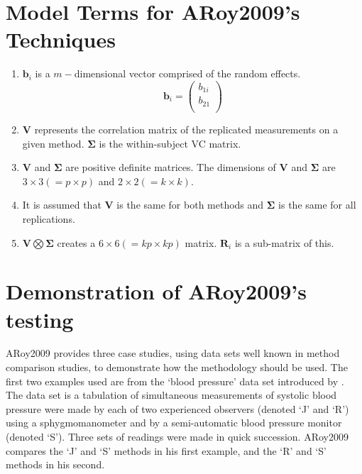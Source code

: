\documentclass[12pt, a4paper]{report}
\theoremstyle{plain}
\theoremstyle{definition}
\theoremstyle{remark}
\begin{document}
	\section{Model Terms for ARoy2009's Techniques}
	\begin{enumerate}
		\item $\boldsymbol{b}_{i}$ is a $m-$dimensional vector comprised of
		the random effects.
		\begin{equation}
		\boldsymbol{b}_{i} = \left( \begin{array}{c}
		b_{1i} \\
		b_{21}  \\
		\end{array}\right)
		\end{equation}
		
		\item $\boldsymbol{V}$ represents the correlation matrix of the replicated measurements on a given method.
		$\boldsymbol{\Sigma}$ is the within-subject VC matrix.
		
		\item $\boldsymbol{V}$ and $\boldsymbol{\Sigma}$ are positive
		definite matrices. The dimensions of $\boldsymbol{V}$ and
		$\boldsymbol{\Sigma}$ are $3 \times 3 ( = p \times p )$ and $ 2 \times
		2 (= k \times k)$.
		
		\item It is assumed that $\boldsymbol{V}$ is the same for both methods and $\boldsymbol{\Sigma}$ is
		the same for all replications.
		
		\item $\boldsymbol{V} \bigotimes \boldsymbol{\Sigma}$ creates a $ 6 \times 6 ( = kp \times
		kp)$ matrix.
		$\boldsymbol{R}_{i}$ is a sub-matrix of this.
	\end{enumerate}
	
	\section{Demonstration of ARoy2009's testing}
	ARoy2009 provides three case studies, using data sets well known in method comparison studies, to demonstrate how the methodology should be used. The first two examples used are from the `blood pressure' data set introduced by \citet{BA99}. The data set is a tabulation of simultaneous measurements of systolic blood pressure were made by each of two experienced observers (denoted `J' and `R') using a sphygmomanometer and by a semi-automatic blood pressure monitor (denoted `S'). Three sets of readings were made in quick succession. ARoy2009 compares the `J' and `S' methods in his first example, and the `R' and `S' methods in his second.
	
\end{document}
